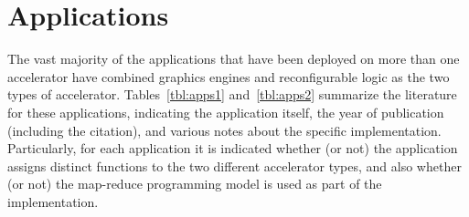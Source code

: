 \section{Applications}
\label{sec:apps}

The vast majority of the applications that have been deployed on
more than one accelerator have combined graphics engines and reconfigurable
logic as the two types of accelerator.
Tables~\ref{tbl:apps1} and~\ref{tbl:apps2} summarize
the literature for these applications,
indicating the application itself, the year of publication (including
the citation), and various notes about the specific implementation.
Particularly, for each application it is indicated whether (or not)
the application assigns distinct functions to the two different
accelerator types, and also whether (or not) the map-reduce programming
model is used as part of the implementation.


